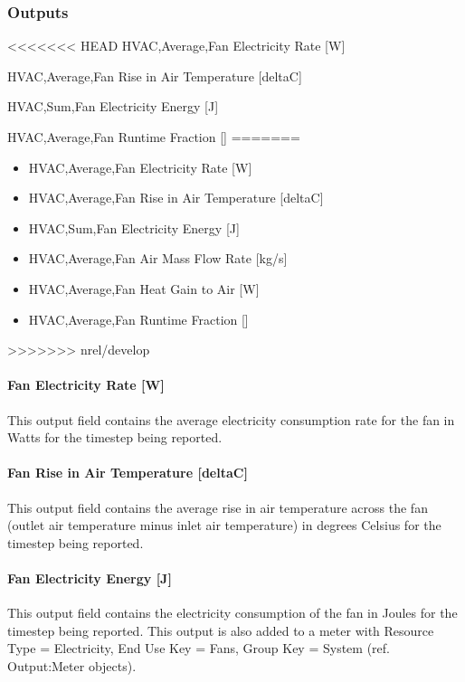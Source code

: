 \subsubsection{Outputs}\label{outputs-1-011}

<<<<<<< HEAD
HVAC,Average,Fan Electricity Rate {[}W{]}

HVAC,Average,Fan Rise in Air Temperature {[}deltaC{]}

HVAC,Sum,Fan Electricity Energy {[}J{]}

HVAC,Average,Fan Runtime Fraction {[]}
=======
\begin{itemize}
\item
  HVAC,Average,Fan Electricity Rate {[}W{]}
\item
  HVAC,Average,Fan Rise in Air Temperature {[}deltaC{]}
\item
  HVAC,Sum,Fan Electricity Energy {[}J{]}
\item
  HVAC,Average,Fan Air Mass Flow Rate {[}kg/s{]}
\item
  HVAC,Average,Fan Heat Gain to Air {[}W{]}
\item
  HVAC,Average,Fan Runtime Fraction {[]}
\end{itemize}
>>>>>>> nrel/develop

\paragraph{Fan Electricity Rate {[}W{]}}\label{fan-electric-power-w-1}

This output field contains the average electricity consumption rate for the fan in Watts for the timestep being reported.

\paragraph{Fan Rise in Air Temperature {[}deltaC{]}}\label{fan-rise-in-air-temperature-deltac-1}

This output field contains the average rise in air temperature across the fan (outlet air temperature minus inlet air temperature) in degrees Celsius for the timestep being reported.

\paragraph{Fan Electricity Energy {[}J{]}}\label{fan-electric-energy-j-1}

This output field contains the electricity consumption of the fan in Joules for the timestep being reported. This output is also added to a meter with Resource Type = Electricity, End Use Key = Fans, Group Key = System (ref. Output:Meter objects).

